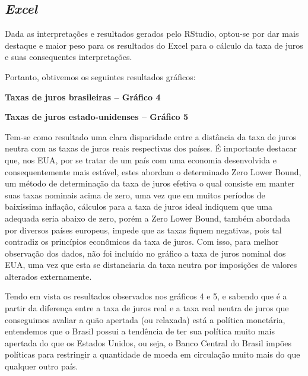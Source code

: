 \noindent 

\subsection*{\textit{Excel}}

\noindent 

Dada as interpreta\c{c}\~{o}es e resultados gerados pelo RStudio, optou-se por dar mais destaque e maior peso para os resultados do Excel para o c\'{a}lculo da taxa de juros e suas consequentes interpreta\c{c}\~{o}es. 

 Portanto, obtivemos os seguintes resultados gr\'{a}ficos: 

\noindent 

\noindent \textbf{Taxas de juros brasileiras -- Gr\'{a}fico 4}

\noindent 


\noindent 

\noindent \textbf{Taxas de juros estado-unidenses -- Gr\'{a}fico 5}


 

Tem-se como resultado uma clara disparidade entre a dist\^{a}ncia da taxa de juros neutra com as taxas de juros reais respectivas dos pa\'{i}ses. \'{E} importante destacar que, nos EUA, por se tratar de um pa\'{i}s com uma economia desenvolvida e consequentemente mais est\'{a}vel, estes abordam o determinado Zero Lower Bound, um m\'{e}todo de determina\c{c}\~{a}o da taxa de juros efetiva o qual consiste em manter suas taxas nominais acima de zero, uma vez que em muitos per\'{i}odos de baix\'{i}ssima infla\c{c}\~{a}o, c\'{a}lculos para a taxa de juros ideal indiquem que uma adequada seria abaixo de zero, por\'{e}m a Zero Lower Bound, tamb\'{e}m abordada por diversos pa\'{i}ses europeus, impede que as taxas fiquem negativas, pois tal contradiz os princ\'{i}pios econ\^{o}micos da taxa de juros. Com isso, para melhor observa\c{c}\~{a}o dos dados, n\~{a}o foi inclu\'{i}do no gr\'{a}fico a taxa de juros nominal dos EUA, uma vez que esta se distanciaria da taxa neutra por imposi\c{c}\~{o}es de valores alterados externamente. 

 Tendo em vista os resultados observados nos gr\'{a}ficos 4 e 5, e sabendo que \'{e} a partir da diferen\c{c}a entre a taxa de juros real e a taxa real neutra de juros que conseguimos avaliar a qu\~{a}o apertada (ou relaxada) est\'{a} a pol\'{i}tica monet\'{a}ria, entendemos que o Brasil possui a tend\^{e}ncia de ter sua pol\'{i}tica muito mais apertada do que os Estados Unidos, ou seja, o Banco Central do Brasil imp\~{o}es pol\'{i}ticas para restringir a quantidade de moeda em circula\c{c}\~{a}o muito mais do que qualquer outro pa\'{i}s. 

